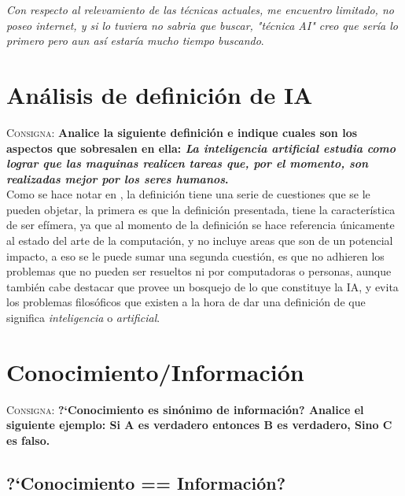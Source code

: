 \documentclass{article}
\begin{document}
\textit{Con respecto al relevamiento de las t\'ecnicas actuales, me encuentro limitado, no poseo internet, y si lo tuviera no sabria que buscar, "t\'ecnica AI" creo que ser\'ia lo primero pero aun as\'i estar\'ia mucho tiempo buscando}.

\section{An\'alisis de definici\'on de IA}
\textsc{Consigna}: \textbf{Analice la siguiente definici\'on e indique cuales son los aspectos que sobresalen en ella: \textit{La inteligencia artificial estudia como lograr que las maquinas realicen tareas que, por el momento, son realizadas mejor por los seres humanos}.}\\

Como se hace notar en \cite{rich2009}, la definici\'on tiene una serie de cuestiones que se le pueden objetar, la primera es que la definici\'on presentada, tiene la caracter\'istica de ser ef\'imera, ya que al momento de la definici\'on se hace referencia \'unicamente al estado del arte de la computaci\'on, y no incluye areas que son de un potencial impacto, a eso se le puede sumar una segunda cuesti\'on, es que no adhieren los problemas que no pueden ser resueltos ni por computadoras o personas, aunque tambi\'en cabe destacar que provee un bosquejo de lo que constituye la IA, y evita los problemas filos\'oficos que existen a la hora de dar una definici\'on de que significa \textit{inteligencia} o \textit{artificial}.

\section{Conocimiento/Informaci\'on}
\textsc{Consigna}: \textbf{?`Conocimiento es sin\'onimo de informaci\'on? Analice el siguiente ejemplo: Si A es verdadero entonces B es verdadero, Sino C es falso.}\\

\subsection{?`Conocimiento == Informaci\'on?}
\end{document}
